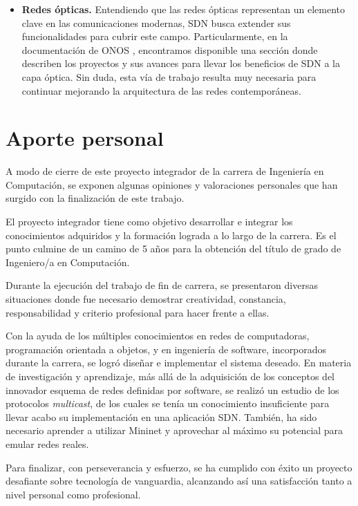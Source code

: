 \begin{itemize}
    \item \textbf{Redes ópticas.} Entendiendo que las redes ópticas representan un elemento clave en las comunicaciones modernas, SDN busca extender sus funcionalidades para cubrir este campo. Particularmente, en la documentación de ONOS \parencite{onosPacketOptical}, encontramos disponible una sección donde describen los proyectos y sus avances para llevar los beneficios de SDN a la capa óptica. Sin duda, esta vía de trabajo resulta muy necesaria para continuar mejorando la arquitectura de las redes contemporáneas.

\end{itemize}

\section{Aporte personal}

A modo de cierre de este proyecto integrador de la carrera de Ingeniería en Computación, se exponen algunas opiniones y valoraciones personales que han surgido con la finalización de este trabajo.

El proyecto integrador tiene como objetivo desarrollar e integrar los conocimientos adquiridos y la formación lograda a lo largo de la carrera. Es el punto culmine de un camino de 5 años para la obtención del título de grado de Ingeniero/a en Computación.

Durante la ejecución del trabajo de fin de carrera, se presentaron diversas situaciones donde fue necesario demostrar creatividad, constancia, responsabilidad y criterio profesional para hacer frente a ellas.   

Con la ayuda de los múltiples conocimientos en redes de computadoras, programación orientada a objetos, y en ingeniería de software, incorporados durante la carrera, se logró diseñar e implementar el sistema deseado. En materia de investigación y aprendizaje, más allá de la adquisición de los conceptos del innovador esquema de redes definidas por software, se realizó un estudio de los protocolos \textit{multicast}, de los cuales se tenía un conocimiento insuficiente para llevar acabo su implementación en una aplicación SDN. También, ha sido necesario aprender a utilizar Mininet y aprovechar al máximo su potencial para emular redes reales.

Para finalizar, con perseverancia y esfuerzo, se ha cumplido con éxito un proyecto desafiante sobre tecnología de vanguardia, alcanzando así una satisfacción tanto a nivel personal como profesional. 
